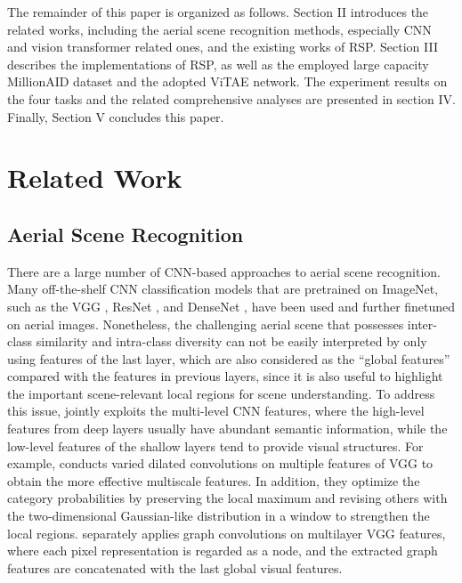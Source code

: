 \documentclass[10pt, journal,twoside]{IEEEtran}
\begin{document}
 The remainder of this paper is organized as follows. Section II introduces the related works, including the aerial scene recognition methods, especially CNN and vision transformer related ones, and the existing works of RSP. Section III describes the implementations of RSP, as well as the employed large capacity MillionAID dataset and the adopted ViTAE network. The experiment results on the four tasks and the related comprehensive analyses are presented in section IV. Finally, Section V concludes this paper.

 \section{Related Work}

 \subsection{Aerial Scene Recognition}
 
 There are a large number of CNN-based approaches to aerial scene recognition. Many off-the-shelf CNN classification models that are pretrained on ImageNet, such as the VGG \cite{vgg}, ResNet \cite{resnet}, and DenseNet \cite{densenet}, have been used and further finetuned on aerial images. Nonetheless, the challenging aerial scene that possesses inter-class similarity and intra-class diversity can not be easily interpreted by only using features of the last layer, which are also considered as the ``global features'' compared with the features in previous layers, since it is also useful to highlight the important scene-relevant local regions for scene understanding. To address this issue, \cite{lse_2021_asr, xu2021_dfagcn} jointly exploits the multi-level CNN features, where the high-level features from deep layers usually have abundant semantic information, while the low-level features of the shallow layers tend to provide visual structures. For example, \cite{lse_2021_asr} conducts varied dilated convolutions on multiple features of VGG to obtain the more effective multiscale features. In addition, they optimize the category probabilities by preserving the local maximum and revising others with the two-dimensional Gaussian-like distribution in a window to strengthen the local regions. \cite{xu2021_dfagcn} separately applies graph convolutions on multilayer VGG features, where each pixel representation is regarded as a node, and the extracted graph features are concatenated with the last global visual features.
\end{document}
